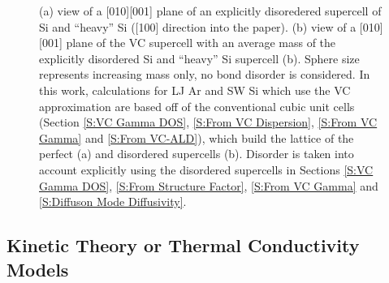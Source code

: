 \documentclass[aps,prb,onecolumn,preprint,superscriptaddress,amsmath,amssymb,floatfix]{revtex4}
\begin{document}
\begin{figure}
\begin{center}
\mbox{}
\vspace*{0mm}
\end{center}
\caption{\label{F:supercells} 
(a) view of a [010][001] plane of  
an explicitly disoredered supercell of 
Si and ``heavy'' Si ([100] direction into the paper).
\cite{momma_vesta:_2008} 
(b) view of a [010][001] plane of the VC supercell 
with an average
mass of the explicitly disordered Si and ``heavy'' Si supercell 
(b). 
Sphere size represents 
increasing mass 
only, no bond disorder is considered. 
In this work, calculations for LJ Ar and SW Si which use the VC 
approximation 
are based off of the conventional cubic unit cells 
(Section \ref{S:VC Gamma DOS}, \ref{S:From VC Dispersion}, 
\ref{S:From VC Gamma} and \ref{S:From VC-ALD}), 
which build the lattice of the perfect (a) 
and disordered supercells (b). 
Disorder is taken into account explicitly using the disordered 
supercells in Sections 
\ref{S:VC Gamma DOS}, \ref{S:From Structure Factor},  
\ref{S:From VC Gamma} and \ref{S:Diffuson Mode Diffusivity}. 
}
\end{figure}



\subsection{\label{S:Kinetic Theory}Kinetic Theory or 
Thermal Conductivity Models}
\end{document}
